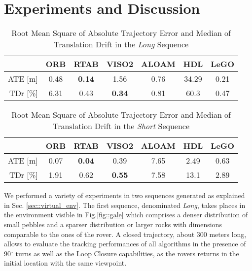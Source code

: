 \documentclass[conference]{IEEEtran}  %
\begin{document}
\section{Experiments and Discussion}\label{sec::exp}
\begin{table}[t]
    \centering
    \caption{Root Mean Square of Absolute Trajectory Error and Median of Translation Drift in the \textit{Long} Sequence}
    \begin{tabular}{|r|c|c|c|c|c|c|}
        \hline
         & \textbf{ORB} & \textbf{RTAB} & \textbf{VISO2} & \textbf{ALOAM} & \textbf{HDL} & \textbf{LeGO} \\
         \hline\hline
         ATE [m]  &  0.48 & \textbf{0.14} & 1.56 & 0.76 & 34.29 & 0.21 \\
         TDr [\%] & 6.31 & 0.43 & \textbf{0.34} & 0.81 & 60.3 & 0.47 \\
     \hline
    \end{tabular}
    \label{tab:rmse_long}
\end{table}
\begin{table}[t]
    \centering
    \caption{Root Mean Square of Absolute Trajectory Error and Median of Translation Drift in the \textit{Short} Sequence}
    \begin{tabular}{|r|c|c|c|c|c|c|}
        \hline
         & \textbf{ORB} & \textbf{RTAB} & \textbf{VISO2} & \textbf{ALOAM} & \textbf{HDL} & \textbf{LeGO} \\
         \hline\hline
         ATE [m]  &  0.07 & \textbf{0.04} & 0.39 & 7.65 & 2.49 & 0.63 \\
         TDr [\%] & 1.91 & 0.62 & \textbf{0.55} & 7.58 & 13.1 & 2.89 \\
     \hline
    \end{tabular}
    \label{tab:rmse_short}
\end{table}
We performed a variety of experiments in two sequences generated as explained in Sec. \ref{sec::virtual_env}.
The first sequence, denominated \textit{Long}, takes places in the environment visible in Fig.\ref{fig::gale} which comprises a denser distribution of small pebbles and a sparser distribution or larger rocks with dimensions comparable to the ones of the rover. A closed trajectory, about 300 meters long, allows to evaluate the tracking performances of all algorithms in the presence of 90$^\circ$ turns as well as the Loop Closure capabilities, as the rovers returns in the initial location with the same viewpoint.
\end{document}
